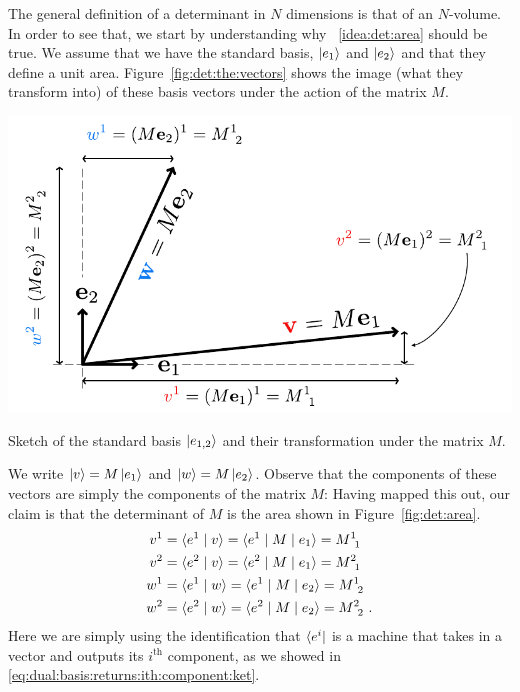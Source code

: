 \documentclass[12pt, oneside]{report}    %
\begin{document}
The general definition of a determinant in $N$ dimensions is that of an $N$-volume. In order to see that, we start by understanding why \bigidearef{}~\ref{idea:det:area} should be true. We assume that we have the standard basis, $\left|e_1\right\rangle$ and $\left|e_2\right\rangle$ and that they define a unit area. Figure~\ref{fig:det:the:vectors} shows the image (what they transform into) of these basis vectors under the action of the matrix $M$.
\begin{marginfigure}%
    \includegraphics[width=\textwidth]{figures/det TheVectors.pdf}
    \caption{Sketch of the standard basis $\left|e_{1,2}\right\rangle$ and their transformation under the matrix $M$.}
    \label{fig:det:the:vectors}
\end{marginfigure}
We write $\left|v\right\rangle = M\left|e_1\right\rangle$ and $\left|w\right\rangle = M\left|e_2\right\rangle$. Observe that the components of these vectors are simply the components of the matrix $M$: Having mapped this out, our claim is that the determinant of $M$ is the area shown in Figure~\ref{fig:det:area}.
\begin{align}
    v^1 &= \la e^1 \mid v\ra = \la e^1 \mid M \mid e_1 \ra  = M\aij{1}{1}
    \label{eq:det:v1:inner:prod}
    \\
    v^2 &= \la e^2 \mid v\ra = \la e^2 \mid M \mid e_1 \ra = M\aij{2}{1}
    \\ 
    w^1 &= \la e^1 \mid w\ra = \la e^1 \mid M \mid e_2 \ra  = M\aij{1}{2}
    \\
    w^2 &= \la e^2 \mid w\ra = \la e^2 \mid M \mid e_2 \ra = M\aij{2}{2}
    \label{eq:det:w2:inner:prod}
    \ .
\end{align}
Here we are simply using the identification that $\langle e^i |$ is a machine that takes in a vector and outputs its $i^\text{th}$ component, as we showed in \eqref{eq:dual:basis:returns:ith:component:ket}.
\end{document}
